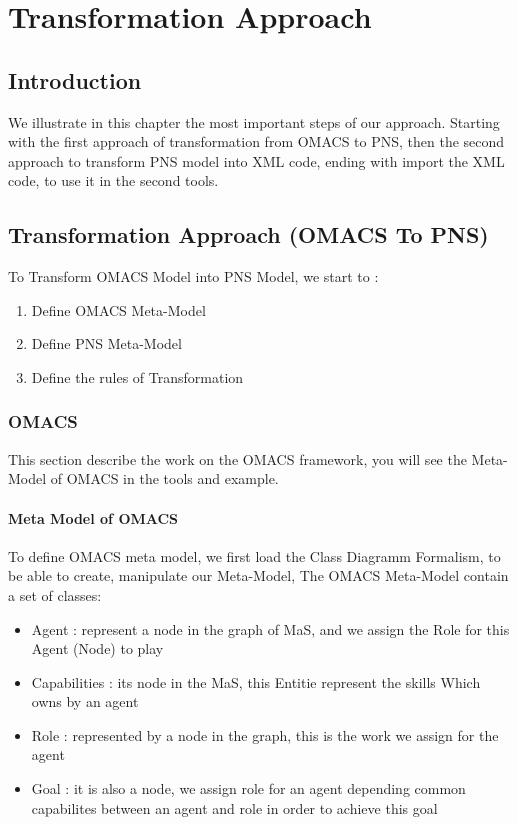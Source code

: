 
\chapter{\label{cha: Transformation Approach } Transformation Approach}
\section{Introduction}
We illustrate in this chapter the most important steps of our approach. Starting with the first
approach of transformation from OMACS to PNS, then the second approach to transform
PNS model into XML code, ending with import the XML code, to use it in the second tools.

\section{Transformation Approach (OMACS To PNS)\label{sec:OMACS into PNS} }%
To Transform OMACS Model into PNS Model, we start to :
\begin{enumerate}
\item Define OMACS Meta-Model 
\item Define PNS Meta-Model
\item Define the rules of Transformation
\end{enumerate}


\subsection{OMACS} 
This section describe the work on the OMACS framework, you will see the Meta-Model of OMACS in the tools and example. 
\subsubsection{Meta Model of OMACS}
\vspace{0.5cm}
To define OMACS meta model, we first load the Class Diagramm Formalism, to be able to create, manipulate our Meta-Model,
The OMACS Meta-Model contain a set of classes:
\pagebreak
\begin{itemize}
\newcommand{\localtextbulletone}{\textcolor{gray}{\raisebox{.45ex}{\rule{.6ex}{.6ex}}}}
\renewcommand{\labelitemi}{\localtextbulletone}
	\item Agent : represent a node in the graph of MaS, and we assign the Role for this Agent (Node) to play 
	\item Capabilities : its node in the MaS, this Entitie represent the skills Which owns by an agent
	\item Role : represented by a node in the graph, this is the work we assign for the agent 
	\item Goal : it is also a node, we assign role for an agent depending common capabilites between an agent and role in order to achieve this goal
\end{itemize}
 
